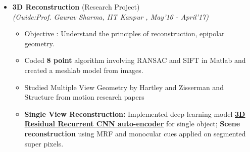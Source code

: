 \documentclass[a4paper,10pt]{article}
\newcommand{\isep}{-2 pt}
\begin{document}
\begin{itemize}
\item \textbf{3D Reconstruction} (Research Project) \\
 \emph{(Guide:Prof. Gaurav Sharma, IIT Kanpur
, May'16 - April'17)} \\[-0.6cm]
	\begin{itemize}\itemsep \isep
	\item Objective : Understand the principles of reconstruction, epipolar geometry.
	\item Coded \textbf{8 point} algorithm involving RANSAC and SIFT in Matlab and created a meshlab model from images. \item Studied Multiple View Geometry by Hartley and Zisserman and Structure from motion research papers
	\item \textbf{Single View Reconstruction:} Implemented deep learning model \textbf{\href{https://arxiv.org/pdf/1604.00449.pdf}{3D Residual Recurrent CNN auto-encoder}} for single object; \textbf{{Scene reconstruction}} using MRF and monocular cues applied on segmented super pixels. 
	\end{itemize}


\end{itemize}
\end{document}
